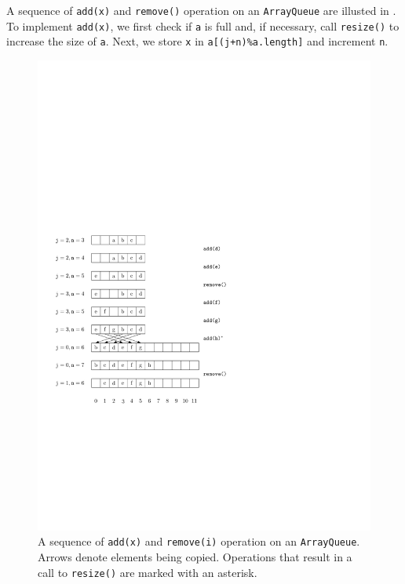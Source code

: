 A sequence of \mbox{\texttt{add({\color{var}x})}} and \mbox{\texttt{remove()}} operation on an \mbox{\texttt{ArrayQueue}} are illusted in .
To implement \mbox{\texttt{add({\color{var}x})}}, we first check if \mbox{\texttt{{\color{var}a}}} is full and, if necessary,
call \mbox{\texttt{resize()}} to increase the size of \mbox{\texttt{{\color{var}a}}}.  Next, we store \mbox{\texttt{{\color{var}x}}} in
\mbox{\texttt{{\color{var}a}[({\color{var}j}+{\color{var}n})\%{\color{var}a}.{\color{var}length}]}} and increment \mbox{\texttt{{\color{var}n}}}.

\begin{figure}
  \begin{center}
    \includegraphics{figs/arrayqueue}
  \end{center}
  \caption{A sequence of \mbox{\texttt{add({\color{var}x})}} and \mbox{\texttt{remove({\color{var}i})}} operation on an
  \mbox{\texttt{ArrayQueue}}.  Arrows denote elements being copied.  Operations that
  result in a call to \mbox{\texttt{resize()}} are marked with an asterisk.}
\end{figure}



